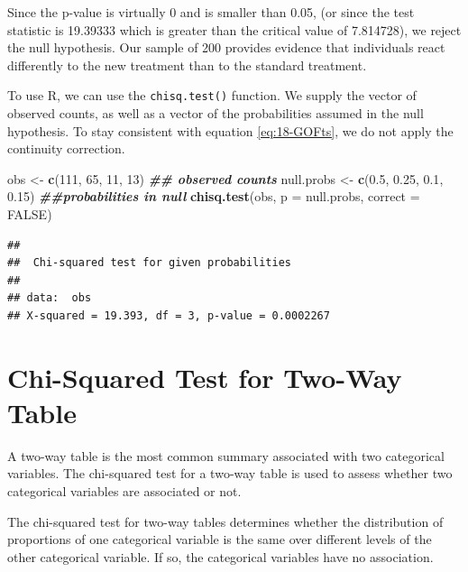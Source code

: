 \documentclass[
]{book}
\newenvironment{Shaded}{\begin{snugshade}}{\end{snugshade}}
\newcommand{\AttributeTok}[1]{\textcolor[rgb]{0.13,0.29,0.53}{#1}}
\newcommand{\ConstantTok}[1]{\textcolor[rgb]{0.56,0.35,0.01}{#1}}
\newcommand{\DecValTok}[1]{\textcolor[rgb]{0.00,0.00,0.81}{#1}}
\newcommand{\DocumentationTok}[1]{\textcolor[rgb]{0.56,0.35,0.01}{\textbf{\textit{#1}}}}
\newcommand{\FloatTok}[1]{\textcolor[rgb]{0.00,0.00,0.81}{#1}}
\newcommand{\FunctionTok}[1]{\textcolor[rgb]{0.13,0.29,0.53}{\textbf{#1}}}
\newcommand{\NormalTok}[1]{#1}
\newcommand{\OtherTok}[1]{\textcolor[rgb]{0.56,0.35,0.01}{#1}}
\theoremstyle{definition}
\theoremstyle{definition}
\theoremstyle{definition}
\theoremstyle{definition}
\theoremstyle{remark}
\begin{document}
Since the p-value is virtually 0 and is smaller than 0.05, (or since the test statistic is 19.39333 which is greater than the critical value of 7.814728), we reject the null hypothesis. Our sample of 200 provides evidence that individuals react differently to the new treatment than to the standard treatment.

To use R, we can use the \texttt{chisq.test()} function. We supply the vector of observed counts, as well as a vector of the probabilities assumed in the null hypothesis. To stay consistent with equation \eqref{eq:18-GOFts}, we do not apply the continuity correction.

\begin{Shaded}
\begin{Highlighting}[]
\NormalTok{obs }\OtherTok{\textless{}{-}} \FunctionTok{c}\NormalTok{(}\DecValTok{111}\NormalTok{, }\DecValTok{65}\NormalTok{, }\DecValTok{11}\NormalTok{, }\DecValTok{13}\NormalTok{) }\DocumentationTok{\#\# observed counts}
\NormalTok{null.probs }\OtherTok{\textless{}{-}} \FunctionTok{c}\NormalTok{(}\FloatTok{0.5}\NormalTok{, }\FloatTok{0.25}\NormalTok{, }\FloatTok{0.1}\NormalTok{, }\FloatTok{0.15}\NormalTok{) }\DocumentationTok{\#\#probabilities in null}
\FunctionTok{chisq.test}\NormalTok{(obs, }\AttributeTok{p =}\NormalTok{ null.probs, }\AttributeTok{correct =} \ConstantTok{FALSE}\NormalTok{)}
\end{Highlighting}
\end{Shaded}

\begin{verbatim}
## 
##  Chi-squared test for given probabilities
## 
## data:  obs
## X-squared = 19.393, df = 3, p-value = 0.0002267
\end{verbatim}

\hypertarget{chi-squared-test-for-two-way-table}{%
\section{Chi-Squared Test for Two-Way Table}\label{chi-squared-test-for-two-way-table}}

A two-way table is the most common summary associated with two categorical variables. The chi-squared test for a two-way table is used to assess whether two categorical variables are associated or not.

The chi-squared test for two-way tables determines whether the distribution of proportions of one categorical variable is the same over different levels of the other categorical variable. If so, the categorical variables have no association.
\end{document}
